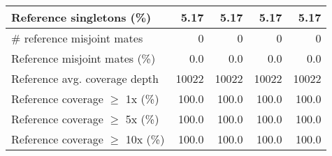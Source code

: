 \documentclass[12pt,a4paper]{article}
\begin{document}
\begin{table}[ht]
\begin{center}
\begin{tabular}{|l*{4}{|r}|}
Reference singletons (\%) & 5.17 & 5.17 & 5.17 & 5.17 \\ \hline
\# reference misjoint mates & 0 & 0 & 0 & 0 \\ \hline
Reference misjoint mates (\%) & 0.0 & 0.0 & 0.0 & 0.0 \\ \hline
Reference avg. coverage depth & 10022 & 10022 & 10022 & 10022 \\ \hline
Reference coverage $\geq$ 1x (\%) & 100.0 & 100.0 & 100.0 & 100.0 \\ \hline
Reference coverage $\geq$ 5x (\%) & 100.0 & 100.0 & 100.0 & 100.0 \\ \hline
Reference coverage $\geq$ 10x (\%) & 100.0 & 100.0 & 100.0 & 100.0 \\ \hline
\end{tabular}
\end{center}
\end{table}
\end{document}
